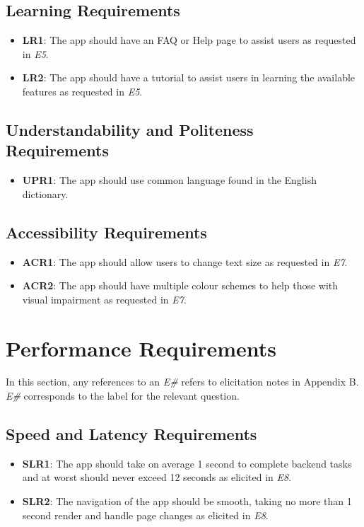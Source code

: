 \documentclass[12pt]{article}
\begin{document}
\subsection{Learning Requirements}
\begin{itemize}
  \item \textbf{LR1}: The app should have an FAQ or Help page to assist users as requested in \textit{E5}.
  \item \textbf{LR2}: The app should have a tutorial to assist users in learning the available
  features as requested in \textit{E5}.
\end{itemize}
\subsection{Understandability and Politeness Requirements}
\begin{itemize}
  \item \textbf{UPR1}: The app should use common language found in the English dictionary.
\end{itemize}
\subsection{Accessibility Requirements}
\begin{itemize}
  \item \textbf{ACR1}: The app should allow users to change text size as requested in \textit{E7}.
  \item \textbf{ACR2}: The app should have multiple colour schemes to help those with visual impairment
  as requested in \textit{E7}.
\end{itemize}

\section{Performance Requirements}
In this section, any references to an \textit{E\#} refers to elicitation notes in Appendix B. \textit{E\#} corresponds
to the label for the relevant question.

\subsection{Speed and Latency Requirements}
\begin{itemize}
  \item \textbf{SLR1}: The app should take on average 1 second to complete backend tasks and at worst should never
  exceed 12 seconds as elicited in \textit{E8}.
  \item \textbf{SLR2}: The navigation of the app should be smooth, taking no more than 1 second render and handle page changes
  as elicited in \textit{E8}.
\end{itemize}
\end{document}
